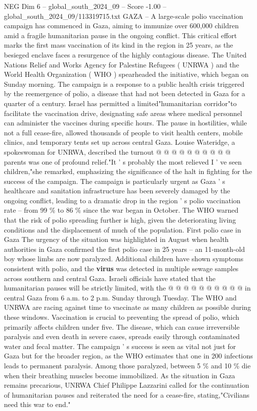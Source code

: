 \begin{textsample}{NEG Dim 6 – global\_south\_2024\_09 – Score -1.00 – global\_south\_2024\_09/113319715.txt}  \label{ex:f6_neg_036}
GAZA -- A large-scale polio vaccination campaign has commenced in Gaza, aiming to immunize over 600,000 children amid a fragile humanitarian pause in the ongoing conflict.
This critical effort marks the first mass vaccination of its kind in the region in 25 years, as the besieged enclave faces a resurgence of the highly contagious disease.
The United Nations Relief and Works Agency for Palestine Refugees ( UNRWA ) and the World Health Organization ( WHO ) spearheaded the initiative, which began on Sunday morning.
The campaign is a response to a public health crisis triggered by the reemergence of polio, a disease that had not been detected in Gaza for a quarter of a century.
Israel has permitted a limited"humanitarian corridor"to facilitate the vaccination drive, designating safe areas where medical personnel can administer the vaccines during specific hours.
The pause in hostilities, while not a full cease-fire, allowed thousands of people to visit health centers, mobile clinics, and temporary tents set up across central Gaza.
Louise Wateridge, a spokeswoman for UNRWA, described the turnout @ @ @ @ @ @ @ @ @ @ parents was one of profound relief."It ' s probably the most relieved I ' ve seen children,"she remarked, emphasizing the significance of the halt in fighting for the success of the campaign.
The campaign is particularly urgent as Gaza ' s healthcare and sanitation infrastructure has been severely damaged by the ongoing conflict, leading to a dramatic drop in the region ' s polio vaccination rate -- from 99 \% to 86 \% since the war began in October.
The WHO warned that the risk of polio spreading further is high, given the deteriorating living conditions and the displacement of much of the population.
First polio case in Gaza The urgency of the situation was highlighted in August when health authorities in Gaza confirmed the first polio case in 25 years -- an 11-month-old boy whose limbs are now paralyzed.
Additional children have shown symptoms consistent with polio, and the \textbf{virus} was detected in multiple sewage samples across southern and central Gaza.
Israeli officials have stated that the humanitarian pauses will be strictly limited, with the @ @ @ @ @ @ @ @ @ @ in central Gaza from 6 a.m. to 2 p.m.
Sunday through Tuesday.
The WHO and UNRWA are racing against time to vaccinate as many children as possible during these windows.
Vaccination is crucial to preventing the spread of polio, which primarily affects children under five.
The disease, which can cause irreversible paralysis and even death in severe cases, spreads easily through contaminated water and fecal matter.
The campaign ' s success is seen as vital not just for Gaza but for the broader region, as the WHO estimates that one in 200 infections leads to permanent paralysis.
Among those paralyzed, between 5 \% and 10 \% die when their breathing muscles become immobilized.
As the situation in Gaza remains precarious, UNRWA Chief Philippe Lazzarini called for the continuation of humanitarian pauses and reiterated the need for a cease-fire, stating,"Civilians need this war to end."

\end{textsample}
